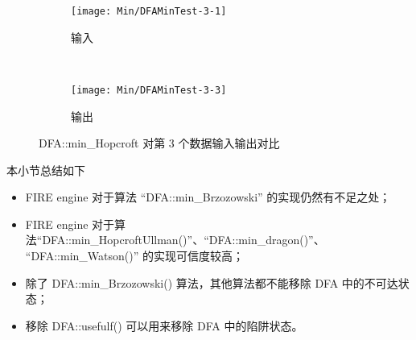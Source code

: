 \begin{figure}[!htbp]
    \centering
    \begin{subfigure}[b]{0.4\textwidth}
        \texttt{[image: Min/DFAMinTest-3-1]}
        \caption{输入}
        \label{fig:DFAMin-3-1-inside}
    \end{subfigure}
    ~
    \begin{subfigure}[b]{0.4\textwidth}
        \texttt{[image: Min/DFAMinTest-3-3]}
        \caption{输出}
        \label{fig:DFAMin-3-3-inside}
    \end{subfigure}
    \caption{DFA::min\_Hopcroft 对第 3 个数据输入输出对比}
    \label{fig:DFAMinHoop-3}
  \end{figure}


本小节总结如下
\begin{itemize}
    \item FIRE engine 对于算法 “DFA::min\_Brzozowski” 的实现仍然有不足之处；
    \item FIRE engine 对于算法“DFA::min\_HopcroftUllman()”、“DFA::min\_dragon()”、\\ “DFA::min\_Watson()” 的实现可信度较高；
    \item 除了 DFA::min\_Brzozowski() 算法，其他算法都不能移除 DFA 中的不可达状态；
    \item 移除 DFA::usefulf() 可以用来移除 DFA 中的陷阱状态。
\end{itemize}
